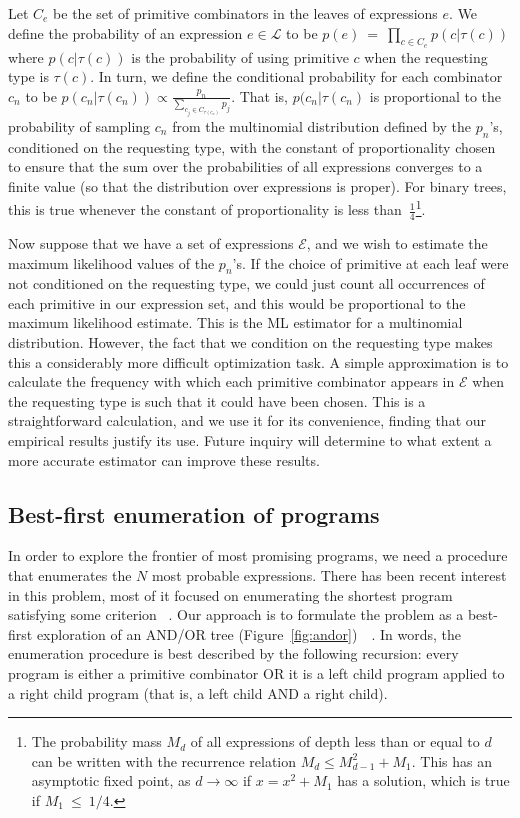 \documentclass{article}
\begin{document}
Let $C_e$ be the set of primitive combinators in the leaves of
expressions $e$. We define the probability of an expression ${e \in
  \mathcal{L}}$ to be ${ p(e)~=~\prod_{c \in C_e} p(c | \tau(c)) }$
where $p(c | \tau(c))$ is the probability of using primitive $c$ when
the requesting type is $\tau(c)$. In turn, we define the conditional
probability for each combinator $c_n$ to be $p(c_n| \tau(c_n)) \propto
\frac{p_n}{\sum_{c_j \in C_{\tau(c_n)}} p_j}$.  That is, $p(c_n | \tau(c_n)$ is
proportional to the probability of sampling $c_n$ from the multinomial
distribution defined by the $p_n$'s, conditioned on the requesting
type, with the constant of proportionality chosen to ensure that the
sum over the probabilities of all expressions converges to a finite
value (so that the distribution over expressions is proper). For
binary trees, this is true whenever the constant of proportionality is
less than~$\frac{1}{4}$\footnote{The probability mass $M_d$ of all
  expressions of depth less than or equal to $d$ can be written with
  the recurrence relation $M_d \leq M_{d-1}^2 + M_1$. This has an
  asymptotic fixed point, as $d \rightarrow \infty$ if $x = x^2 + M_1$
  has a solution, which is true if $M_1~\leq~1/4$.}.

Now suppose that we have a set of expressions $\mathcal{E}$, and we
wish to estimate the maximum likelihood values of the $p_n$'s. If the
choice of primitive at each leaf were not conditioned on the
requesting type, we could just count all occurrences of each primitive
in our expression set, and this would be proportional to the maximum
likelihood estimate. This is the ML estimator for a multinomial
distribution. However, the fact that we condition on the requesting
type makes this a considerably more difficult optimization task. A
simple approximation is to calculate the frequency with which each
primitive combinator appears in $\mathcal{E}$ when the requesting type
is such that it could have been chosen. This is a straightforward
calculation, and we use it for its convenience, finding that our
empirical results justify its use. Future inquiry will determine to
what extent a more accurate estimator can improve these results.

\subsection{Best-first enumeration of programs}
In order to explore the frontier of most promising programs, we need a
procedure that enumerates the $N$ most probable expressions. There has
been recent interest in this problem, most of it focused on
enumerating the shortest program satisfying some
criterion~\cite{DBLP:conf/sfp/Katayama05}
\cite{DBLP:conf/aaip/YakushevJ09}. Our approach is to formulate the
problem as a best-first exploration of an AND/OR tree
(Figure~\ref{fig:andor})~\cite{nilsson1982principles}~\cite{DBLP:journals/cacm/Hall73}. In
words, the enumeration procedure is best described by the following
recursion: every program is either a primitive combinator OR it is a
left child program applied to a right child program (that is, a left
child AND a right child).
\end{document}
